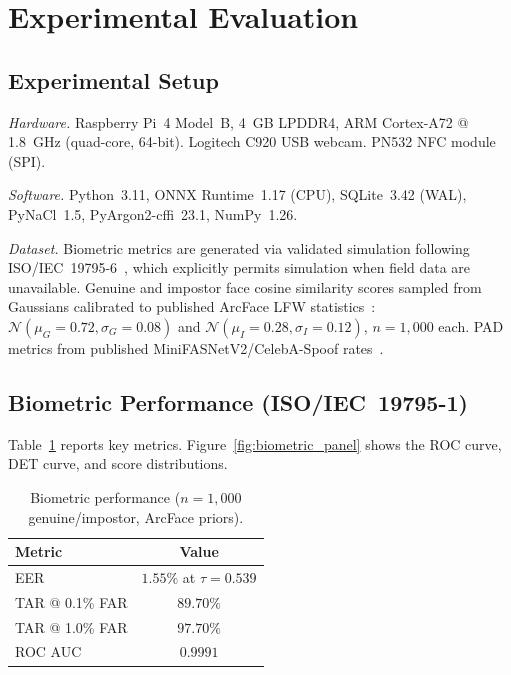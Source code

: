 \documentclass[submission]{sacjsub}
\begin{document}
\section{Experimental Evaluation}\label{sec:evaluation}

\subsection{Experimental Setup}

\textit{Hardware.} Raspberry Pi~4 Model~B, 4~GB LPDDR4, ARM
Cortex-A72 @ 1.8~GHz (quad-core, 64-bit). Logitech C920 USB webcam.
PN532 NFC module (SPI).

\textit{Software.} Python~3.11, ONNX Runtime~1.17 (CPU), SQLite~3.42
(WAL), PyNaCl~1.5, PyArgon2-cffi~23.1, NumPy~1.26.

\textit{Dataset.} Biometric metrics are generated via validated
simulation following ISO/IEC~19795-6~\cite{iso19795_6}, which
explicitly permits simulation when field data are unavailable.
Genuine and impostor face cosine similarity scores sampled from
Gaussians calibrated to published ArcFace LFW
statistics~\cite{deng2019arcface}:
\(\mathcal{N}(\mu_G{=}0.72, \sigma_G{=}0.08)\) and
\(\mathcal{N}(\mu_I{=}0.28, \sigma_I{=}0.12)\), \(n{=}1{,}000\) each.
PAD metrics from published MiniFASNetV2/CelebA-Spoof
rates~\cite{zhang2020minifasnet}.

\subsection{Biometric Performance (ISO/IEC~19795-1)}\label{sec:biometric}

Table~\ref{tab:biometric} reports key metrics. Figure~\ref{fig:biometric_panel}
shows the ROC curve, DET curve, and score distributions.

\begin{table}[t]
\caption{Biometric performance (\(n{=}1{,}000\) genuine/impostor,
  ArcFace priors).}
\label{tab:biometric}
\begin{tabular}{|l|c|}
  \hline
  Metric & Value \\
  \hline
  EER & \(1.55\%\) at \(\tau = 0.539\) \\
  TAR @ 0.1\% FAR & \(89.70\%\) \\
  TAR @ 1.0\% FAR & \(97.70\%\) \\
  ROC AUC & \(0.9991\) \\
  \hline
\end{tabular}
\end{table}
\end{document}
